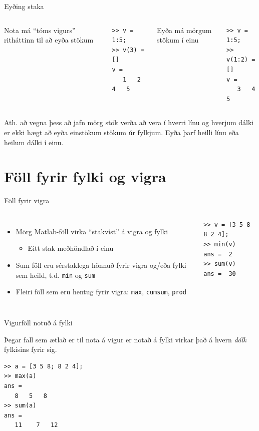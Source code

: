 \documentclass[handout]{beamer}
\begin{document}
\begin{frame}[fragile]{Eyðing staka}
\begin{columns}
Nota má ``tóms vigurs'' ritháttinn til að eyða stökum
\begin{verbatim}
>> v = 1:5;
>> v(3) = []
v =
   1   2   4   5

\end{verbatim}
Eyða má mörgum stökum í einu
\begin{verbatim}
>> v = 1:5;
>> v(1:2) = []
v =
   3   4   5
\end{verbatim}
\end{columns}
\vspace{\baselineskip}
Ath. að vegna þess að jafn mörg stök verða að vera í hverri línu og hverjum dálki er ekki hægt að eyða einstökum stökum úr fylkjum. Eyða þarf heilli línu eða heilum dálki í einu.
\end{frame}

\section{Föll fyrir fylki og vigra}

\begin{frame}[fragile]{Föll fyrir vigra}
\begin{columns}
\begin{itemize}
 \item Mörg Matlab-föll virka ``stakvíst'' á vigra og fylki
 \begin{itemize}
  \item Eitt stak meðhöndlað í einu
 \end{itemize}
 \item Sum föll eru sérstaklega hönnuð fyrir vigra og/eða fylki sem heild, t.d. \texttt{min} og \texttt{sum}
 \item Fleiri föll sem eru hentug fyrir vigra: \texttt{max}, \texttt{cumsum}, \texttt{prod}
\end{itemize}
\begin{verbatim}
>> v = [3 5 8 8 2 4];
>> min(v)
ans =  2
>> sum(v)
ans =  30
\end{verbatim}
\end{columns}
\end{frame}

\begin{frame}[fragile]{Vigurföll notuð á fylki}

Þegar fall sem ætlað er til nota á vigur er notað á fylki virkar það á hvern \emph{dálk} fylkisins fyrir sig.

\begin{verbatim}
>> a = [3 5 8; 8 2 4];
>> max(a)
ans =
   8   5   8
>> sum(a)
ans =
   11    7   12
\end{verbatim}
\end{frame}
\end{document}
